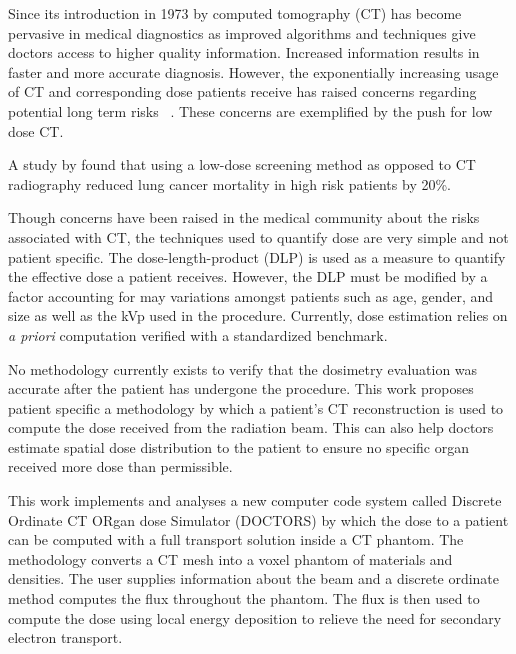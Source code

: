 

Since its introduction in 1973 by \citet{ref:hounsfieldg} computed tomography (CT) has become pervasive in medical diagnostics as improved algorithms and techniques give doctors access to higher quality information. Increased information results in faster and more accurate diagnosis. However, the exponentially increasing usage of CT and corresponding dose patients receive has raised concerns regarding potential long term risks~\citep{ref:brennerd} \citep{ref:einsteina1} \citep{ref:abramsh} \citep{ref:einsteina2} \citep{ref:mccolloughc} \citep{ref:yul}. These concerns are exemplified by the push for low dose CT.

A study by \citet{ref:kovalchiks} found that using a low-dose screening method as opposed to CT radiography reduced lung cancer mortality in high risk patients by 20\%. 

Though concerns have been raised in the medical community about the risks associated with CT, the techniques used to quantify dose are very simple and not patient specific. The dose-length-product (DLP) is used as a measure to quantify the effective dose a patient receives. However, the DLP must be modified by a factor accounting for may variations amongst patients such as age, gender, and size as well as the kVp used in the procedure. Currently, dose estimation relies on \textit{a priori} computation verified with a standardized benchmark. 

No methodology currently exists to verify that the dosimetry evaluation was accurate after the patient has undergone the procedure. This work proposes patient specific a methodology by which a patient's CT reconstruction is used to compute the dose received from the radiation beam. This can also help doctors estimate spatial dose distribution to the patient to ensure no specific organ received more dose than permissible.

This work implements and analyses a new computer code system called Discrete Ordinate CT ORgan dose Simulator (DOCTORS) by which the dose to a patient can be computed with a full transport solution inside a CT phantom. The methodology converts a CT mesh into a voxel phantom of materials and densities. The user supplies information about the beam and a discrete ordinate method computes the flux throughout the phantom. The flux is then used to compute the dose using local energy deposition to relieve the need for secondary electron transport.

